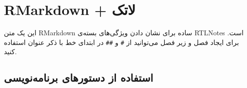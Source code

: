 \documentclass[
]{article}
\def\authorVjust{-320}
\def\authorHjust{-40}
\begin{document}
\begin{titlepage}
\end{titlepage}











\thispagestyle{empty}
{
\setcounter{tocdepth}{3}
\tableofcontents
\newpage
}




\hypertarget{rmarkdown-ux644ux627ux62aux6a9}{%
\section{RMarkdown + لاتک}\label{rmarkdown-ux644ux627ux62aux6a9}}

این یک متن RMarkdown ساده برای نشان دادن ویژگی‌های بسته‌ی RTLNotes است.
برای ایجاد فصل و زیر فصل می‌توانید از ‍‍‍‍‍‍\texttt{\#} و \texttt{\#\#}
در ابتدای خط با ذکر عنوان استفاده کنید.

\hypertarget{ux627ux633ux62aux641ux627ux62fux647-ux627ux632-ux62fux633ux62aux648ux631ux647ux627ux6cc-ux628ux631ux646ux627ux645ux647ux646ux648ux6ccux633ux6cc}{%
\subsection{استفاده از دستورهای
برنامه‌نویسی}\label{ux627ux633ux62aux641ux627ux62fux647-ux627ux632-ux62fux633ux62aux648ux631ux647ux627ux6cc-ux628ux631ux646ux627ux645ux647ux646ux648ux6ccux633ux6cc}}
\end{document}
